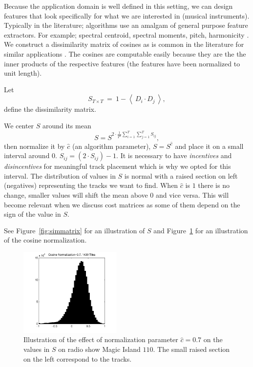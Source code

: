 \documentclass[twocolumn]{article}
\begin{document}
	Because the application domain is well defined in this setting, we can design features that look specifically for what we are interested in (musical instruments). Typically in the literature; algorithms use an amalgam of general purpose feature extractors. For example; spectral centroid, spectral moments, pitch, harmonicity \cite{tzanetakis1999framework}. We construct a dissimilarity matrix of cosines as is common in the literature for similar applications \cite{foote1999visualizing}. The cosines are computable easily because they are the the inner products of the respective features (the features have been normalized to unit length).
	
	Let
	\[
	S_{T \times T} ~=~ 1-\left<~D_{i} \cdot D_{j}~\right>,
	\] define the dissimilarity matrix.
	
	We center $S$ around its mean \[
	S = S^{2 \cdot \frac{1}{T^2}\sum_{i=1}^T \sum_{j=1}^T S_{ij}},
	\] then normalize it by $\hat c$ (an algorithm parameter), $S=S^{\hat c}$ and place it on a small interval around $0$. $S_{ij} = \left( 2 \cdot S_{ij} \right)-1$. It is necessary to have \textit{incentives} and \textit{disincentives} for meaningful track placement which is why we opted for this interval. The distribution of values in $S$ is normal with a raised section on left (negatives) representing the tracks we want to find. When $\hat c$ is $1$ there is no change, smaller values will shift the mean above $0$ and vice versa. This will become relevant when we discuss cost matrices as some of them depend on the sign of the value in $S$. 
	
	See Figure~\ref{fig:simmatrix} for an illustration of $S$ and Figure~\ref{fig:cosine_norm} for an illustration of the cosine normalization.
	
		\begin{figure}
			\centering
			\includegraphics[width=0.45\textwidth]{images/cosinesmagic110}
			
			\caption{Illustration of the effect of normalization parameter $\hat c=0.7$ on the values in $S$ on radio show Magic Island $110$. The small raised section on the left correspond to the tracks.}
			\label{fig:cosine_norm}
		\end{figure} 
	
\end{document}
